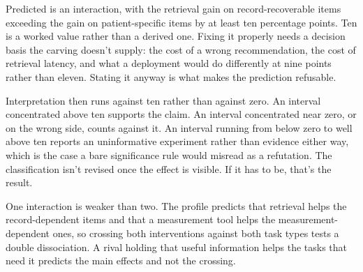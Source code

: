 \documentclass[12pt]{article}
\begin{document}
Predicted is an interaction, with the retrieval gain on record-recoverable items exceeding
the gain on patient-specific items by at least ten percentage points. Ten is a worked value
rather than a derived one. Fixing it properly needs a decision basis the carving doesn't
supply: the cost of a wrong recommendation, the cost of retrieval latency, and what a
deployment would do differently at nine points rather than eleven. Stating it anyway is what
makes the prediction refusable.

Interpretation then runs against ten rather than against zero. An interval concentrated
above ten supports the claim. An interval concentrated near zero, or on the wrong side,
counts against it. An interval running from below zero to well above ten reports an
uninformative experiment rather than evidence either way, which is the case a bare
significance rule would misread as a refutation. The classification isn't revised once the
effect is visible. If it has to be, that's the result.

One interaction is weaker than two. The profile predicts that retrieval helps the
record-dependent items and that a measurement tool helps the measurement-dependent ones, so
crossing both interventions against both task types tests a double dissociation. A rival
holding that useful information helps the tasks that need it predicts the main effects and
not the crossing.
\end{document}
